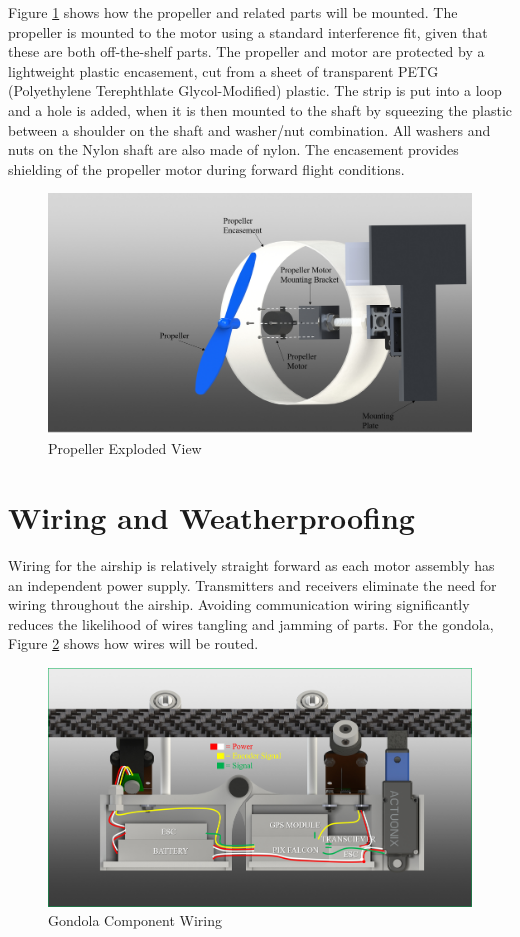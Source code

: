 \documentclass[../main.tex]{subfiles}
\begin{document}
 Figure \ref{fig:propAssembly} shows how the propeller and related parts will be mounted. The propeller is mounted to the motor using a standard interference fit, given that these are both off-the-shelf parts. The propeller and motor are protected by a lightweight plastic encasement, cut from a sheet of transparent PETG (Polyethylene Terephthlate Glycol-Modified) plastic. The strip is put into a loop and a hole is added, when it is then mounted to the shaft by squeezing the plastic between a shoulder on the shaft and washer/nut combination. All washers and nuts on the Nylon shaft are also made of nylon. The encasement provides shielding of the propeller motor during forward flight conditions.

\begin{figure}[H]
	\centering
	\includegraphics[width=.8\linewidth]{img/design/thruster/propAssembly.png}
	\caption{Propeller Exploded View}
	\label{fig:propAssembly}
\end{figure}

\section{Wiring and Weatherproofing}
Wiring for the airship is relatively straight forward as each motor assembly has an  independent power supply. Transmitters and receivers eliminate the need for wiring throughout the airship. Avoiding communication wiring significantly reduces the likelihood of wires tangling and jamming of parts. For the gondola, Figure \ref{fig:gondolaWiring} shows how wires will be routed. 

\begin{figure}[H]
	\centering
	\includegraphics[width=.8\linewidth]{img/design/gondola/gondolaWiring.png}
	\caption{Gondola Component Wiring}
	\label{fig:gondolaWiring}
\end{figure}
\end{document}
